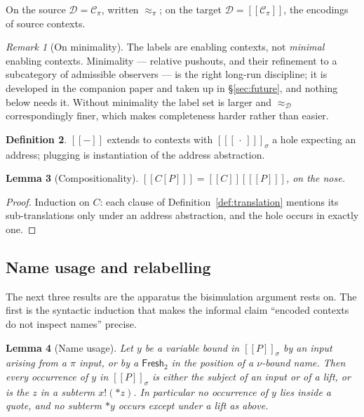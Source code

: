 \documentclass[11pt]{article}
\theoremstyle{definition}
\newtheorem{definition}{Definition}[section]
\theoremstyle{plain}
\newtheorem{lemma}[definition]{Lemma}
\theoremstyle{remark}
\newtheorem{remark}[definition]{Remark}
\newcommand{\drp}[1]{{*}#1}
\newcommand{\out}[2]{#1!(#2)}
\newcommand{\enc}[1]{[\![#1]\!]}
\newcommand{\Frsh}{\mathsf{Fresh}_2}
\newcommand{\Ctx}{\mathscr{C}}
\newcommand{\Obs}{\mathcal{D}}
\newcommand{\bisim}{\approx}
\begin{document}
On the source $\Obs = \Ctx_\pi$, written $\bisim_\pi$; on the target
$\Obs = \enc{\Ctx_\pi}$, the encodings of source contexts.

\begin{remark}[On minimality]
The labels are enabling contexts, not \emph{minimal} enabling contexts.
Minimality --- relative pushouts, and their refinement to a subcategory
of admissible observers --- is the right long-run discipline; it is
developed in the companion paper \cite{BIHOL} and taken up in
\S\ref{sec:future}, and nothing below needs it. Without minimality the
label set is larger and $\bisim_\Obs$ correspondingly finer, which makes
completeness harder rather than easier.
\end{remark}

\begin{definition}
$\enc{-}$ extends to contexts with $\enc{[\,\cdot\,]}_\sigma$ a hole
expecting an address; plugging is instantiation of the address
abstraction.
\end{definition}

\begin{lemma}[Compositionality]\label{lem:compositional}
$\enc{C[P]} = \enc{C}[\enc{P}]$, on the nose.
\end{lemma}

\begin{proof}
Induction on $C$: each clause of Definition~\ref{def:translation}
mentions its sub-translations only under an address abstraction, and the
hole occurs in exactly one.
\end{proof}

\subsection{Name usage and relabelling}

The next three results are the apparatus the bisimulation argument rests
on. The first is the syntactic induction that makes the informal claim
``encoded contexts do not inspect names'' precise.

\begin{lemma}[Name usage]\label{lem:usage}
Let $y$ be a variable bound in $\enc{P}_\sigma$ by an input arising from
a $\pi$ input, or by a $\Frsh$ in the position of a $\nu$-bound name.
Then every occurrence of $y$ in $\enc{P}_\sigma$ is either the subject of
an input or of a lift, or is the $z$ in a subterm $\out{x}{\drp{z}}$. In
particular no occurrence of $y$ lies inside a quote, and no subterm
$\drp{y}$ occurs except under a lift as above.
\end{lemma}
\end{document}
